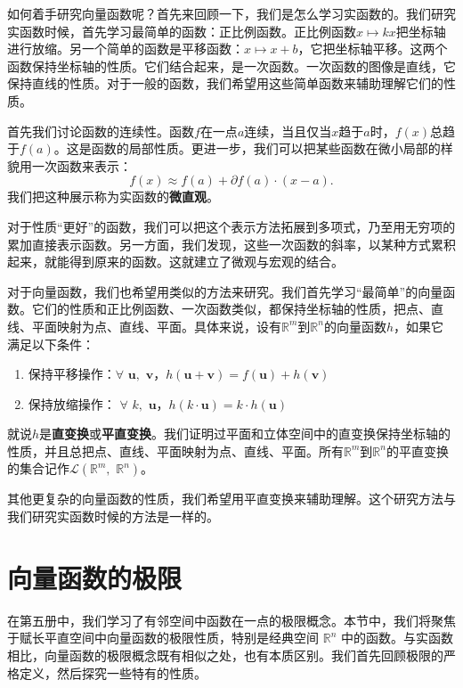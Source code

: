 \documentclass[12pt,UTF8,fontset=none]{ctexbook}
\begin{document}
如何着手研究向量函数呢？首先来回顾一下，我们是怎么学习实函数的。我们研究实函数时候，首先学习最简单的函数：正比例函数。正比例函数$x\mapsto kx$把坐标轴进行放缩。另一个简单的函数是平移函数：$x \mapsto x + b$，它把坐标轴平移。这两个函数保持坐标轴的性质。它们结合起来，是一次函数。一次函数的图像是直线，它保持直线的性质。对于一般的函数，我们希望用这些简单函数来辅助理解它们的性质。

首先我们讨论函数的连续性。函数$f$在一点$a$连续，当且仅当$x$趋于$a$时，$f(x)$总趋于$f(a)$。这是函数的局部性质。更进一步，我们可以把某些函数在微小局部的样貌用一次函数来表示：
$$ f(x) \approx f(a) + \partial f(a) \cdot (x - a).$$
我们把这种展示称为实函数的\textbf{微直观}。

对于性质“更好”的函数，我们可以把这个表示方法拓展到多项式，乃至用无穷项的累加直接表示函数。另一方面，我们发现，这些一次函数的斜率，以某种方式累积起来，就能得到原来的函数。这就建立了微观与宏观的结合。

对于向量函数，我们也希望用类似的方法来研究。我们首先学习“最简单”的向量函数。它们的性质和正比例函数、一次函数类似，都保持坐标轴的性质，把点、直线、平面映射为点、直线、平面。具体来说，设有$\mathbb{R}^m$到$\mathbb{R}^n$的向量函数$h$，如果它满足以下条件：
\begin{enumerate}[label=\arabic*.]
    \item 保持平移操作：$\forall \,\,\mathbf{u}, \,\,\mathbf{v}$，$h(\mathbf{u} + \mathbf{v}) = f(\mathbf{u}) + h(\mathbf{v})$
    \item 保持放缩操作： $\forall \,\,k, \,\, \mathbf{u}$，$h(k\cdot \mathbf{u}) = k \cdot h(\mathbf{u})$
\end{enumerate}
就说$h$是\textbf{直变换}或\textbf{平直变换}。我们证明过平面和立体空间中的直变换保持坐标轴的性质，并且总把点、直线、平面映射为点、直线、平面。所有$\mathbb{R}^m$到$\mathbb{R}^n$的平直变换的集合记作$\mathcal{L}(\mathbb{R}^m, \,\,\mathbb{R}^n)$。

其他更复杂的向量函数的性质，我们希望用平直变换来辅助理解。这个研究方法与我们研究实函数时候的方法是一样的。

\section{向量函数的极限}

在第五册中，我们学习了有邻空间中函数在一点的极限概念。本节中，我们将聚焦于赋长平直空间中向量函数的极限性质，特别是经典空间 $\mathbb{R}^n$ 中的函数。与实函数相比，向量函数的极限概念既有相似之处，也有本质区别。我们首先回顾极限的严格定义，然后探究一些特有的性质。
\end{document}
